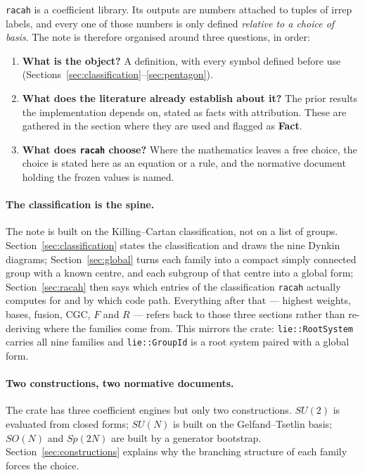 \documentclass[11pt,a4paper]{article}
\theoremstyle{plain}
\theoremstyle{definition}
\newcommand{\code}[1]{\texttt{#1}}
\begin{document}
\code{racah} is a coefficient library. Its outputs are numbers attached to
tuples of irrep labels, and every one of those numbers is only defined
\emph{relative to a choice of basis}. The note is therefore organised around
three questions, in order:

\begin{enumerate}[label=(\roman*),leftmargin=2.2em]
  \item \textbf{What is the object?} A definition, with every symbol defined
    before use (Sections~\ref{sec:classification}--\ref{sec:pentagon}).
  \item \textbf{What does the literature already establish about it?} The
    prior results the implementation depends on, stated as facts with
    attribution. These are gathered in the section where they are used and
    flagged as \textbf{Fact}.
  \item \textbf{What does \code{racah} choose?} Where the mathematics leaves a
    free choice, the choice is stated here as an equation or a rule, and the
    normative document holding the frozen values is named.
\end{enumerate}

\paragraph{The classification is the spine.} The note is built on the
Killing--Cartan classification, not on a list of groups. Section~\ref{sec:classification}
states the classification and draws the nine Dynkin diagrams;
Section~\ref{sec:global} turns each family into a compact simply connected
group with a known centre, and each subgroup of that centre into a global
form; Section~\ref{sec:racah} then says which entries of the classification
\code{racah} actually computes for and by which code path. Everything after
that --- highest weights, bases, fusion, CGC, $F$ and $R$ --- refers back to
those three sections rather than re-deriving where the families come from.
This mirrors the crate: \code{lie::RootSystem} carries all nine families and
\code{lie::GroupId} is a root system paired with a global form.

\paragraph{Two constructions, two normative documents.} The crate has three
coefficient engines but only two constructions. $SU(2)$ is evaluated from
closed forms; $SU(N)$ is built on the Gelfand--Tsetlin basis; $SO(N)$ and
$Sp(2N)$ are built by a generator bootstrap. Section~\ref{sec:constructions}
explains why the branching structure of each family forces the choice.
\end{document}
